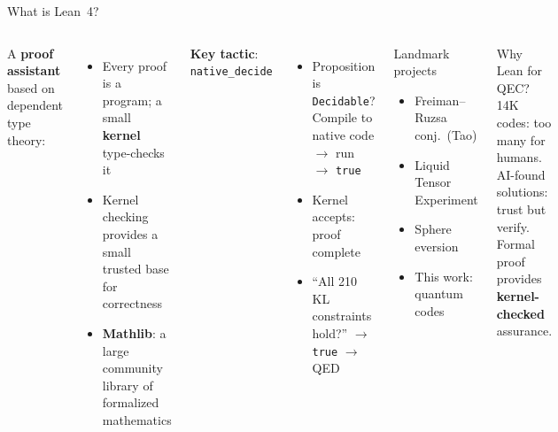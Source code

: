 \documentclass[aspectratio=169,t,10pt]{beamer}
\newcommand{\code}[1]{\texttt{\small #1}}
\begin{document}
\begin{frame}{What is Lean~4?}

\begin{columns}[T]
A \textbf{proof assistant} based on dependent type theory:
\begin{itemize}\setlength\itemsep{0pt}
\item Every proof is a program; a small \textbf{kernel} type-checks it
\item Kernel checking provides a small trusted base for correctness
\item \textbf{Mathlib}: a large community library of formalized mathematics
\end{itemize}

\textbf{Key tactic}: \code{native\_decide}
\begin{itemize}\setlength\itemsep{0pt}
\item Proposition is \code{Decidable}?
  Compile to native code $\to$ run $\to$ \code{true}
\item Kernel accepts: proof complete
\item ``All 210 KL constraints hold?''
  $\to$ \code{true} $\to$ QED
\end{itemize}

\begin{exampleblock}{Landmark projects}
\begin{itemize}\setlength\itemsep{0pt}
\item Freiman--Ruzsa conj.\ (Tao)
\item Liquid Tensor Experiment
\item Sphere eversion
\item \alert{This work}: quantum codes
\end{itemize}
\end{exampleblock}

\begin{block}{Why Lean for QEC?}
14K codes: too many for humans.\\
AI-found solutions: trust but verify.\\
Formal proof provides \textbf{kernel-checked} assurance.
\end{block}
\end{columns}
\end{frame}
\end{document}
